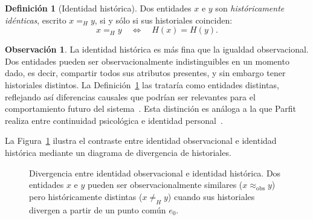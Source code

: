 \documentclass[12pt]{article}
\theoremstyle{plain}
\theoremstyle{definition}
\newtheorem{definition}[theorem]{Definición}
\newtheorem{remark}[theorem]{Observación}
\begin{document}
\begin{definition}[Identidad histórica]
\label{def:identidad}
Dos entidades $x$ e $y$ son \emph{históricamente idénticas}, escrito $x =_H y$, si y sólo si sus historiales coinciden:
\[
x =_H y \quad\Longleftrightarrow\quad H(x) = H(y).
\]
\end{definition}

\begin{remark}
La identidad histórica es más fina que la igualdad observacional. Dos entidades pueden ser observacionalmente indistinguibles en un momento dado, es decir, compartir todos sus atributos presentes, y sin embargo tener historiales distintos. La Definición~\ref{def:identidad} las trataría como entidades distintas, reflejando así diferencias causales que podrían ser relevantes para el comportamiento futuro del sistema~\cite{kim,fine}. Esta distinción es análoga a la que Parfit realiza entre continuidad psicológica e identidad personal~\cite{parfit}.
\end{remark}

La Figura~\ref{fig:identidad} ilustra el contraste entre identidad observacional e identidad histórica mediante un diagrama de divergencia de historiales.

\begin{figure}[ht]
\centering
{}
\caption{Divergencia entre identidad observacional e identidad histórica. Dos entidades $x$ e $y$ pueden ser observacionalmente similares ($x \approx_{\text{obs}} y$) pero históricamente distintas ($x \neq_H y$) cuando sus historiales divergen a partir de un punto común $e_0$.}
\label{fig:identidad}
\end{figure}
\end{document}
